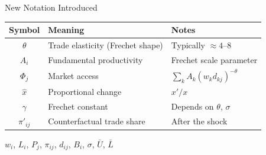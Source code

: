 \documentclass{beamer}
\begin{document}
\begin{frame}{New Notation Introduced}

    {\footnotesize
    \begin{center}
    \begin{tabular}{cll}
        \toprule
        \textbf{Symbol} & \textbf{Meaning} & \textbf{Notes} \\
        \midrule
        $\theta$ & Trade elasticity (Frechet shape) & Typically $\approx 4$--$8$ \\
        $A_i$ & Fundamental productivity & Frechet scale parameter \\
        $\Phi_j$ & Market access & $\sum_k A_k (w_k d_{kj})^{-\theta}$ \\
        $\hat{x}$ & Proportional change & $x'/x$ \\
        $\gamma$ & Frechet constant & Depends on $\theta$, $\sigma$ \\
        $\pi'_{ij}$ & Counterfactual trade share & After the shock \\
        \bottomrule
    \end{tabular}
    \end{center}
    }

    \vspace{0.3em}
     $w_i$, $L_i$, $P_j$, $\pi_{ij}$, $d_{ij}$, $B_i$, $\sigma$, $\bar{U}$, $\bar{L}$

\end{frame}
\end{document}
